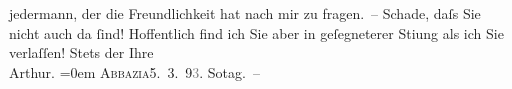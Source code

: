 \begin{ledgroupsized}[t]{13cm}
               jedermann, der die Freundlichkeit hat nach mir zu fragen. – Schade, daſs {\pb}Sie nicht auch da ſind! Hoffentlich find ich Sie aber
               in geſegneterer Sti{\geminationm}ung als ich Sie verlaſſen!\pend
           \pstart
           Stets der Ihre{\\[\baselineskip]}\spacefill\mbox{Arthur.}\pend
           \leftskip=0em{}\pstart
           \textsc{Abbazia}5. 3. 9\textcolor{gray}{3}. So{\geminationn}tag. –\pend
           \endnumbering{}\end{ledgroupsized}  \newcommand{\dateiname}{L00185}\newcommand{\titel}{Arthur Schnitzler an Richard Beer-Hofmann, 5. 3. 1893}\newcommand{\editorInnen}{Martin Anton Müller und Gerd-Hermann Susen}
      